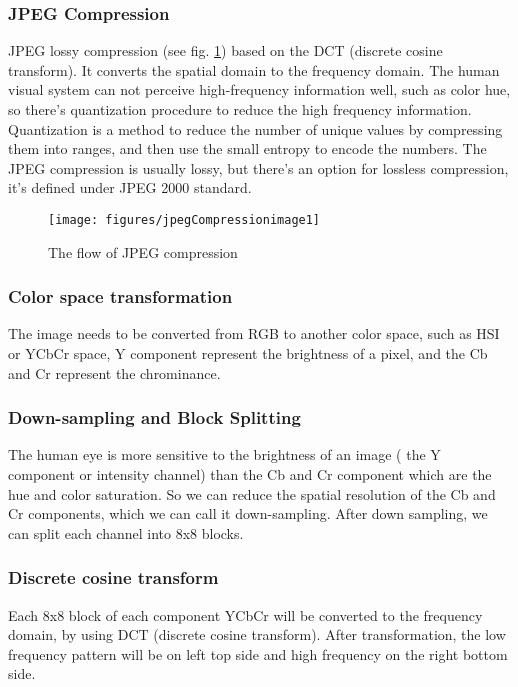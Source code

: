 \subsubsection{JPEG Compression}
JPEG lossy compression (see fig. \ref{fig:jpegcompressflow}) based on the DCT (discrete cosine transform). It converts the spatial domain to the frequency domain. The human visual system can not perceive high-frequency information well, such as color hue, so there's quantization procedure to reduce the high frequency information. Quantization is a method to reduce the number of unique values by compressing them into ranges, and then use the small entropy to encode the numbers. The JPEG compression is usually lossy, but there's an option for lossless compression, it's defined under JPEG 2000 standard.


\begin{figure}[hbt]
  \center
        \texttt{[image: figures/jpegCompressionimage1]}
        \caption{The flow of JPEG compression}
  \label{fig:jpegcompressflow}
\end{figure}

\subsubsection{Color space transformation}
The image needs to be converted from RGB to another color space, such as HSI or YCbCr space, Y component represent the brightness of a pixel, and the Cb and Cr represent the chrominance. 

\subsubsection{Down-sampling and Block Splitting}
The human eye is more sensitive to the brightness of an image ( the Y component or intensity channel) than the Cb and Cr component which are the hue and color saturation. So we can reduce the spatial resolution of the Cb and Cr components, which we can call it down-sampling. After down sampling, we can split each channel into 8x8 blocks. 

\subsubsection{Discrete cosine transform}
Each 8x8 block of each component YCbCr will be converted to the frequency domain, by using DCT (discrete cosine transform). After transformation, the low frequency pattern will be on left top side and high frequency on the right bottom side.

